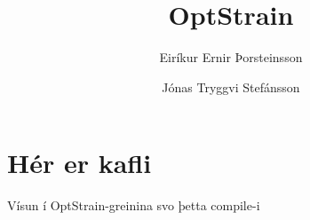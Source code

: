 \documentclass[12pt]{article}
\title{OptStrain}
\author{Eiríkur Ernir Þorsteinsson \and Jónas Tryggvi Stefánsson}
\begin{document}
\maketitle

\section{Hér er kafli}

Vísun í OptStrain-greinina svo þetta compile-i \cite{pharkya2004optstrain}



\end{document}
